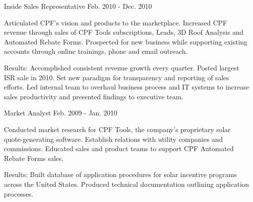 \begin{cventries}
\cventry
{Inside Sales Representative} %
{} %
{} %
{Feb. 2010 - Dec. 2010} %
{ %
\begin{cvitems}
\item {Articulated CPF’s vision and products to the marketplace. Increased CPF revenue through sales of CPF Tools subscriptions, Leads, 3D Roof Analysis and Automated Rebate Forms. Prospected for new business while supporting existing accounts through online trainings, phone and email outreach.} %
\end{cvitems}
}
\begin{cvitemsnb}
\item {Results: Accomplished consistent revenue growth every quarter. Posted largest ISR sale in 2010. Set new paradigm for transparency and reporting of sales efforts. Led internal team to overhaul business process and IT systems to increase sales productivity and presented findings to executive team.}
\end{cvitemsnb}	


\cventry
{Market Analyst} %
{} %
{} %
{Feb. 2009 - Jan. 2010} %
{ %
\begin{cvitems}
\item {Conducted market research for CPF Tools, the company’s proprietary solar quote-generating software. Establish relations with utility companies and commissions. Educated sales and product teams to support CPF Automated Rebate Forms sales.}
\end{cvitems}
}
\begin{cvitemsnb}
\item {Results: Built database of application procedures for solar incentive programs across the United States. Produced technical documentation outlining application processes.}
\end{cvitemsnb}	


\end{cventries}